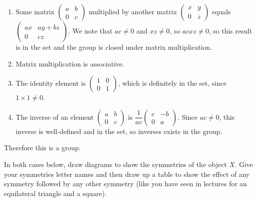\documentclass[a4paper]{article}
\begin{document}
\begin{enumerate}
    \item Some matrix $\begin{pmatrix}a & b \\ 0 & c\end{pmatrix}$ multiplied by another matrix $\begin{pmatrix}x & y \\ 0 & z\end{pmatrix}$ equals \linebreak $\begin{pmatrix}ax & ay + bz \\ 0 & cz\end{pmatrix}$. We note that $ac \ne 0$ and $xz \ne 0$, so $acxz \ne 0$, so this result is in the set and the group is closed under matrix multiplication.
    \item Matrix multiplication is associative.
    \item The identity element is $\begin{pmatrix}1 & 0 \\ 0 & 1\end{pmatrix}$, which is definitely in the set, since $1 \times 1 \ne 0$.
    \item The inverse of an element $\begin{pmatrix}a & b \\ 0 & c\end{pmatrix}$ is $\dfrac1{ac} \begin{pmatrix}c & -b \\ 0 & a\end{pmatrix}$. Since $ac \ne 0$, this inverse is well-defined and in the set, so inverses exists in the group.
\end{enumerate}

Therefore this is a group.


\begin{questionbody}
In both cases below, draw diagrams to show the symmetries of the object $X$. Give your symmetries letter names and then draw up a table to show the effect of any symmetry followed by any other symmetry (like you have seen in lectures for an equilateral triangle and a square).
\end{questionbody}

\subsection{~} %
\end{document}
